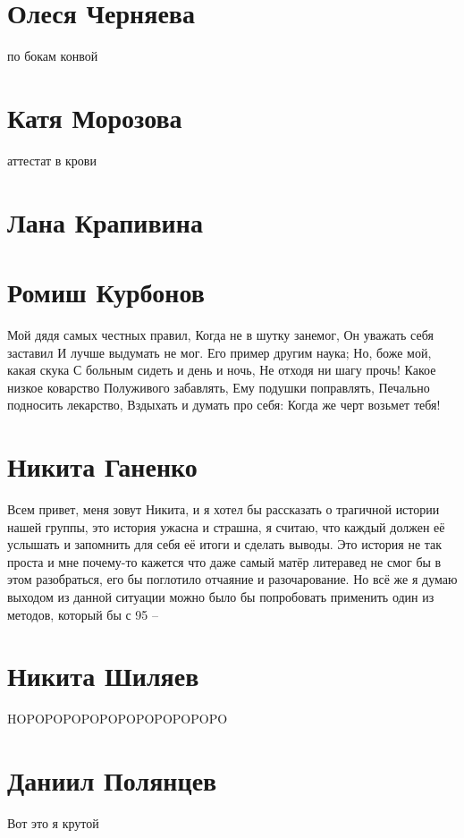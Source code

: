 \documentclass{article}
\begin{document}
\section*{Олеся Черняева}
по бокам конвой

\section*{Катя Морозова}
аттестат в крови

\section*{Лана Крапивина}

\section*{Ромиш Курбонов}

Мой дядя самых честных правил, Когда не в шутку занемог, Он уважать себя заставил И лучше выдумать не мог.
Его пример другим наука; Но, боже мой, какая скука С больным сидеть и день и ночь, Не отходя ни шагу прочь!
Какое низкое коварство Полуживого забавлять, Ему подушки поправлять, Печально подносить лекарство,
Вздыхать и думать про себя: Когда же черт возьмет тебя!

\section*{Никита Ганенко}

Всем привет, меня зовут Никита, и я хотел бы рассказать о трагичной истории нашей группы, это история ужасна и страшна, я считаю, что каждый должен её услышать и запомнить для себя её итоги и сделать выводы. Это история не так проста и мне почему-то кажется что даже самый матёр литеравед не смог бы в этом разобраться, его бы поглотило отчаяние и разочарование. Но всё же я думаю выходом из данной ситуации можно было бы попробовать применить один из методов, который бы с 95%
--
\section*{Никита Шиляев}

HOPOPOPOPOPOPOPOPOPOPOPO


\section *{Даниил Полянцев}
Вот это я крутой
\end{document}
